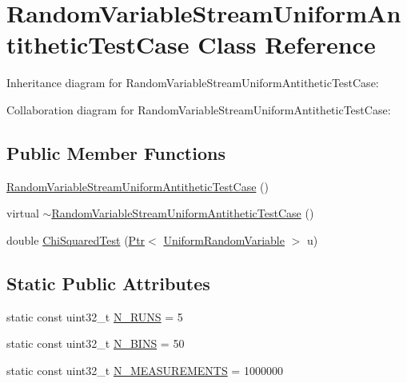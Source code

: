 \hypertarget{classRandomVariableStreamUniformAntitheticTestCase}{}\section{Random\+Variable\+Stream\+Uniform\+Antithetic\+Test\+Case Class Reference}
\label{classRandomVariableStreamUniformAntitheticTestCase}


Inheritance diagram for Random\+Variable\+Stream\+Uniform\+Antithetic\+Test\+Case\+:


Collaboration diagram for Random\+Variable\+Stream\+Uniform\+Antithetic\+Test\+Case\+:
\subsection*{Public Member Functions}
\begin{DoxyCompactItemize}
\item 
\hyperlink{classRandomVariableStreamUniformAntitheticTestCase_a60e66f0e1b541627684be810bf315cb7}{Random\+Variable\+Stream\+Uniform\+Antithetic\+Test\+Case} ()
\item 
virtual \hyperlink{classRandomVariableStreamUniformAntitheticTestCase_a82c5df51b91d32af0b0a59326a3441b1}{$\sim$\+Random\+Variable\+Stream\+Uniform\+Antithetic\+Test\+Case} ()
\item 
double \hyperlink{classRandomVariableStreamUniformAntitheticTestCase_af58e40a706e13445a6adfbdb4873ad45}{Chi\+Squared\+Test} (\hyperlink{classns3_1_1Ptr}{Ptr}$<$ \hyperlink{classns3_1_1UniformRandomVariable}{Uniform\+Random\+Variable} $>$ u)
\end{DoxyCompactItemize}
\subsection*{Static Public Attributes}
\begin{DoxyCompactItemize}
\item 
static const uint32\+\_\+t \hyperlink{classRandomVariableStreamUniformAntitheticTestCase_a536a5cfa5a8c115b90bd28725552da65}{N\+\_\+\+R\+U\+NS} = 5
\item 
static const uint32\+\_\+t \hyperlink{classRandomVariableStreamUniformAntitheticTestCase_a5190e19d3366cfdbdcf9dd3d67fcb667}{N\+\_\+\+B\+I\+NS} = 50
\item 
static const uint32\+\_\+t \hyperlink{classRandomVariableStreamUniformAntitheticTestCase_ae266badde024691eca523904beeb81f5}{N\+\_\+\+M\+E\+A\+S\+U\+R\+E\+M\+E\+N\+TS} = 1000000
\end{DoxyCompactItemize}
